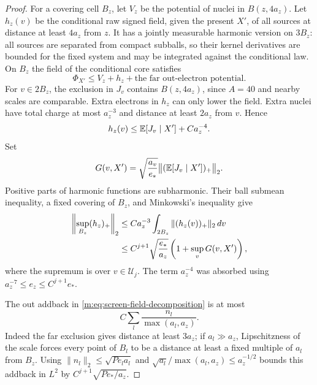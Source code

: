 \begin{proof}
For a covering cell $B_z$, let $V_z$ be the potential of nuclei in
$B(z,4a_z)$.  Let $h_z(v)$ be the conditional raw signed field, given
the present $X'$, of all sources at distance at least $4a_z$ from $z$.
It has a jointly measurable harmonic version on $3B_z$: all
sources are separated from compact subballs, so their kernel
derivatives are bounded for the fixed system and may be integrated
against the conditional law.  On $B_z$ the field of the conditional core
satisfies
\begin{equation}\label{m:eq:screen-field-decomposition}
 \Phi_{X'}\le V_z+h_z+\text{the far out-electron potential}.
\end{equation}
For $v\in2B_z$, the exclusion in $J_v$ contains $B(z,4a_z)$, since
$A=40$ and nearby scales are comparable.  Extra electrons in $h_z$
can only lower the field.  Extra nuclei have total charge at most
$a_z^{-3}$ and distance at least $2a_z$ from $v$.  Hence
\begin{equation}\label{m:eq:screen-harmonic-raw}
 h_z(v)\le\mathbb E[J_v\mid X']+Ca_z^{-4}.
\end{equation}
Set
\[
 G(v,X')=\sqrt{\frac{a_v}{e_*}}
           \big\|(\mathbb E[J_v\mid X'])_+\big\|_2.
\]
Positive parts of harmonic functions are subharmonic.  Their ball
submean inequality, a fixed covering of $B_z$, and Minkowski's inequality
give
\begin{align}\label{m:eq:screen-harmonic-sup}
 \left\|\sup_{B_z}(h_z)_+\right\|_2
 &\le Ca_z^{-3}\int_{2B_z}\|(h_z(v))_+\|_2\,dv\\
 &\le C^{j+1}\sqrt{\frac{e_*}{a_z}}
        \left(1+\sup_vG(v,X')\right),\notag
\end{align}
where the supremum is over $v\in\mathcal U_j$.  The term
$a_z^{-4}$ was absorbed using $a_z^{-7}\le e_z\le C^{j+1}e_*$.

The out addback in \eqref{m:eq:screen-field-decomposition} is at most
\[
 C\sum_l\frac{n_l}{\max(a_l,a_z)}.
\]
Indeed the far exclusion gives distance at least $3a_z$; if
$a_l\gg a_z$, Lipschitzness of the scale forces every point of $B_l$
to be a distance at least a fixed multiple of $a_l$ from $B_z$.
Using $\|n_l\|_2\le\sqrt{Pe_la_l}$ and
$\sqrt{a_l}/\max(a_l,a_z)\le a_z^{-1/2}$ bounds this addback in
$L^2$ by $C^{j+1}\sqrt{Pe_*/a_z}$.


\end{proof}
